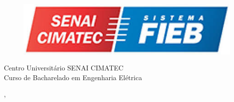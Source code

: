   \begin{capa}%
    \begin{figure}[h!]%
        \centering%
        \includegraphics[scale=0.4]{figs/logo_senai.jpeg}%
      \end{figure}%
    \center
	\ABNTEXchapterfont\large{Centro Universitário SENAI CIMATEC\\Curso de Bacharelado em Engenharia Elétrica}

    \vfill
    \ABNTEXchapterfont\bfseries\LARGE\imprimirtitulo
    \vfill

	\ABNTEXchapterfont\large\imprimirautor
	\vfill
%
    \large\imprimirlocal, \large\imprimirdata

    \vspace*{1cm}
  \end{capa}
